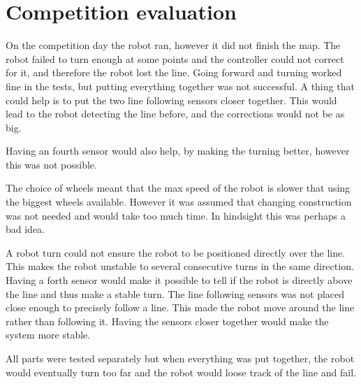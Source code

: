 \section{Competition evaluation}
On the competition day the robot ran, however it did not finish the map.
The robot failed to turn enough at some points and the controller could not correct for it, and therefore the robot lost the line.
Going forward and turning worked fine in the tests, but putting everything together was not successful.
A thing that could help is to put the two line following sensors closer together.
This would lead to the robot detecting the line before, and the corrections would not be as big. 

Having an fourth sensor would also help, by making the turning better, however this was not possible.

The choice of wheels meant that the max speed of the robot is slower that using the biggest wheels available.
However it was assumed that changing construction was not needed and would take too much time.
In hindsight this was perhaps a bad idea.


A robot turn could not ensure the robot to be positioned directly over the line.
This makes the robot unstable to several consecutive turns in the same direction.
Having a forth sensor would make it possible to tell if the robot is directly above the line and thus make a stable turn.
The line following sensors was not placed close enough to precisely follow a line.
This made the robot move around the line rather than following it.
Having the sensors closer together would make the system more stable.  

All parts were tested separately but when everything was put together, the robot would eventually turn too far and the robot would loose track of the line and fail.
